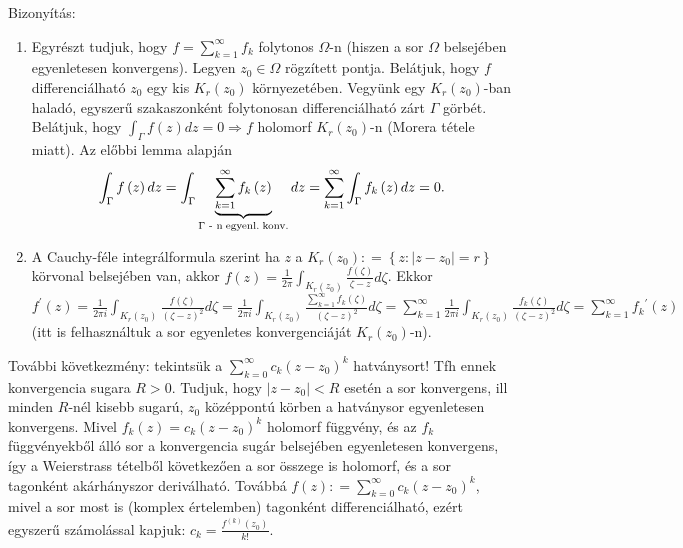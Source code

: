 \documentclass[12pt,a4paper]{scrartcl}
\providecommand{\tightlist}{%
  \setlength{\itemsep}{0pt}\setlength{\parskip}{0pt}}
\newenvironment{bizonyitas}{}{}
\begin{document}
\begin{bizonyitas}

Bizonyítás:

\begin{enumerate}
\def\labelenumi{\arabic{enumi}.}
\tightlist
\item
  Egyrészt tudjuk, hogy \(f = {\sum\limits_{k = 1}^{\infty}f_{k}}\)
  folytonos \(\Omega\)-n (hiszen a sor \(\Omega\) belsejében
  egyenletesen konvergens). Legyen \(z_{0} \in \Omega\) rögzített
  pontja. Belátjuk, hogy \(f\) differenciálható \(z_{0}\) egy kis
  \(K_{r}\left( z_{0} \right)\) környezetében. Vegyünk egy
  \(K_{r}\left( z_{0} \right)\)-ban haladó, egyszerű szakaszonként
  folytonosan differenciálható zárt \(\Gamma\) görbét. Belátjuk, hogy
  \(\left. {\int_{\Gamma}{f\left( z \right)dz}} = 0\Rightarrow f \right.\)
  holomorf \(K_{r}\left( z_{0} \right)\)-n (Morera tétele miatt). Az
  előbbi lemma alapján
  \[\int_\Gamma  {f\left( z \right)dz}  = \int_\Gamma  {\underbrace {\mathop \sum \limits_{k = 1}^\infty  {f_k}\left( z \right)}_{\Gamma {\text{ - n\;egyenl}}{\text{.\;konv}}{\text{.}}}dz}  = \mathop \sum \limits_{k = 1}^\infty  \int_\Gamma  {{f_k}\left( z \right)dz}  = 0. \]
\item
  A Cauchy-féle integrálformula szerint ha \(z\) a
  \(K_{r}\left( z_{0} \right): = \left\{ {z:\left| {z - z_{0}} \right| = r} \right\}\)
  körvonal belsejében van, akkor
  \(f\left( z \right) = \frac{1}{2\pi}{\int_{K_{r}{(z_{0})}}{\frac{f\left( \zeta \right)}{\zeta - z}d\zeta}}\).
  Ekkor
  \(f^{\prime}\left( z \right) = \frac{1}{2\pi i}{\int_{K_{r}{(z_{0})}}{\frac{f\left( \zeta \right)}{\left( {\zeta - z} \right)^{2}}d\zeta}} = \frac{1}{2\pi i}{\int_{K_{r}{(z_{0})}}{\frac{\sum\limits_{k = 1}^{\infty}{f_{k}\left( \zeta \right)}}{\left( {\zeta - z} \right)^{2}}d\zeta}} = {\sum\limits_{k = 1}^{\infty}{\frac{1}{2\pi i}{\int_{K_{r}{(z_{0})}}{\frac{f_{k}\left( \zeta \right)}{\left( {\zeta - z} \right)^{2}}d\zeta}}}} = {\sum\limits_{k = 1}^{\infty}{f_{k}{}^{\prime}}}\left( z \right)\)
  (itt is felhasználtuk a sor egyenletes konvergenciáját
  \(K_{r}\left( z_{0} \right)\)-n).
\end{enumerate}

\end{bizonyitas}

További következmény: tekintsük a
\(\sum\limits_{k = 0}^{\infty}{c_{k}\left( {z - z_{0}} \right)^{k}}\)
hatványsort! Tfh ennek konvergencia sugara \(R > 0\). Tudjuk, hogy
\(\left| {z - z_{0}} \right| < R\) esetén a sor konvergens, ill minden
\(R\)-nél kisebb sugarú, \(z_{0}\) középpontú körben a hatványsor
egyenletesen konvergens. Mivel
\(f_{k}\left( z \right) = c_{k}\left( {z - z_{0}} \right)^{k}\) holomorf
függvény, és az \(f_{k}\) függvényekből álló sor a konvergencia sugár
belsejében egyenletesen konvergens, így a Weierstrass tételből
következően a sor összege is holomorf, és a sor tagonként akárhányszor
deriválható. Továbbá
\(f\left( z \right): = {\sum\limits_{k = 0}^{\infty}{c_{k}\left( {z - z_{0}} \right)^{k}}}\),
mivel a sor most is (komplex értelemben) tagonként differenciálható,
ezért egyszerű számolással kapjuk:
\(c_{k} = \frac{f^{(k)}\left( z_{0} \right)}{k!}\).
\end{document}

